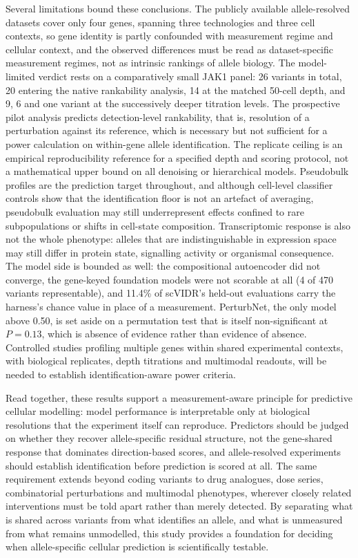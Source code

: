 \documentclass[11pt,letterpaper]{article}
\begin{document}
Several limitations bound these conclusions. The publicly available allele-resolved datasets cover only four genes, spanning three technologies and three cell contexts, so gene identity is partly confounded with measurement regime and cellular context, and the observed differences must be read as dataset-specific measurement regimes, not as intrinsic rankings of allele biology. The model-limited verdict rests on a comparatively small JAK1 panel: 26 variants in total, 20 entering the native rankability analysis, 14 at the matched 50-cell depth, and 9, 6 and one variant at the successively deeper titration levels. The prospective pilot analysis predicts detection-level rankability, that is, resolution of a perturbation against its reference, which is necessary but not sufficient for a power calculation on within-gene allele identification. The replicate ceiling is an empirical reproducibility reference for a specified depth and scoring protocol, not a mathematical upper bound on all denoising or hierarchical models. Pseudobulk profiles are the prediction target throughout, and although cell-level classifier controls show that the identification floor is not an artefact of averaging, pseudobulk evaluation may still underrepresent effects confined to rare subpopulations or shifts in cell-state composition. Transcriptomic response is also not the whole phenotype: alleles that are indistinguishable in expression space may still differ in protein state, signalling activity or organismal consequence. The model side is bounded as well: the compositional autoencoder did not converge, the gene-keyed foundation models were not scorable at all (4 of 470 variants representable), and 11.4\% of scVIDR's held-out evaluations carry the harness's chance value in place of a measurement. PerturbNet, the only model above 0.50, is set aside on a permutation test that is itself non-significant at $P = 0.13$, which is absence of evidence rather than evidence of absence. Controlled studies profiling multiple genes within shared experimental contexts, with biological replicates, depth titrations and multimodal readouts, will be needed to establish identification-aware power criteria.

Read together, these results support a measurement-aware principle for predictive cellular modelling: model performance is interpretable only at biological resolutions that the experiment itself can reproduce. Predictors should be judged on whether they recover allele-specific residual structure, not the gene-shared response that dominates direction-based scores, and allele-resolved experiments should establish identification before prediction is scored at all. The same requirement extends beyond coding variants to drug analogues, dose series, combinatorial perturbations and multimodal phenotypes, wherever closely related interventions must be told apart rather than merely detected. By separating what is shared across variants from what identifies an allele, and what is unmeasured from what remains unmodelled, this study provides a foundation for deciding when allele-specific cellular prediction is scientifically testable.
\end{document}
